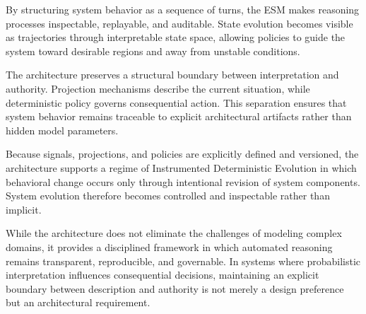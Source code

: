 \documentclass[11pt]{article}
\begin{document}
By structuring system behavior as a sequence of turns, the ESM makes reasoning processes inspectable, replayable, and auditable. State evolution becomes visible as trajectories through interpretable state space, allowing policies to guide the system toward desirable regions and away from unstable conditions.

The architecture preserves a structural boundary between interpretation and authority. Projection mechanisms describe the current situation, while deterministic policy governs consequential action. This separation ensures that system behavior remains traceable to explicit architectural artifacts rather than hidden model parameters.

Because signals, projections, and policies are explicitly defined and versioned, the architecture supports a regime of Instrumented Deterministic Evolution in which behavioral change occurs only through intentional revision of system components. System evolution therefore becomes controlled and inspectable rather than implicit.

While the architecture does not eliminate the challenges of modeling complex domains, it provides a disciplined framework in which automated reasoning remains transparent, reproducible, and governable. In systems where probabilistic interpretation influences consequential decisions, maintaining an explicit boundary between description and authority is not merely a design preference but an architectural requirement.




\end{document}
